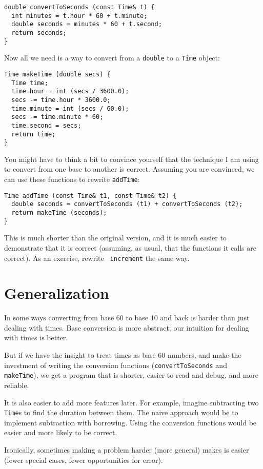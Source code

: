 \begin{verbatim}
double convertToSeconds (const Time& t) {
  int minutes = t.hour * 60 + t.minute;
  double seconds = minutes * 60 + t.second;
  return seconds;
}
\end{verbatim}
%
Now all we need is a way to convert from a {\tt double}
to a {\tt Time} object:

\begin{verbatim}
Time makeTime (double secs) {
  Time time;
  time.hour = int (secs / 3600.0);
  secs -= time.hour * 3600.0;
  time.minute = int (secs / 60.0);
  secs -= time.minute * 60;
  time.second = secs;
  return time;
}
\end{verbatim}
%
You might have to think a bit to convince yourself that the technique
I am using to convert from one base to another is correct.  Assuming
you are convinced, we can use these functions to rewrite {\tt addTime}:

\begin{verbatim}
Time addTime (const Time& t1, const Time& t2) {
  double seconds = convertToSeconds (t1) + convertToSeconds (t2);
  return makeTime (seconds);
}
\end{verbatim}
%
This is much shorter than the original version, and it is much easier
to demonstrate that it is correct (assuming, as usual, that the
functions it calls are correct).  As an exercise, rewrite {\tt
increment} the same way.


\section{Generalization}

In some ways converting from base 60 to base 10 and back is
harder than just dealing with times.  Base conversion is more
abstract; our intuition for dealing with times is better.

But if we have the insight to treat times as base 60 numbers,
and make the investment of writing the conversion functions
({\tt convertToSeconds} and {\tt makeTime}), we get
a program that is shorter, easier to read and debug, and more
reliable.

It is also easier to add more features later.  For example, imagine
subtracting two {\tt Time}s to find the duration between them.  The
naive approach would be to implement subtraction with
borrowing.  Using the conversion functions would be easier and more
likely to be correct.

Ironically, sometimes making a problem harder (more general)
makes is easier (fewer special cases, fewer opportunities for error).

